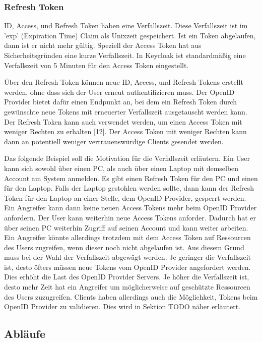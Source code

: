 \subsubsection{Refresh Token}

ID, Access, und Refresh Token haben eine Verfallszeit. Diese Verfallszeit ist im 'exp' (Expiration Time) Claim als Unixzeit gespeichert. Ist ein Token abgelaufen, dann ist er nicht mehr gültig. Speziell der Access Token hat aus Sicherheitsgründen eine kurze Verfallszeit. In Keycloak ist standardmäßig eine Verfallszeit von 5 Minuten für den Access Token eingestellt.

Über den Refresh Token können neue ID, Access, und Refresh Tokens erstellt werden, ohne dass sich der User erneut authentifizieren muss. Der OpenID Provider bietet dafür einen Endpunkt an, bei dem ein Refresh Token durch gewünschte neue Tokens mit erneuerter Verfallszeit ausgetauscht werden kann. Der Refresh Token kann auch verwendet werden, um einen Access Token mit weniger Rechten zu erhalten [12]. Der Access Token mit weniger Rechten kann dann an potentiell weniger vertrauenswürdige Clients gesendet werden.

Das folgende Beispiel soll die Motivation für die Verfallszeit erläutern. Ein User kann sich sowohl über einen PC, als auch über einen Laptop mit demselben Account am System anmelden. Es gibt einen Refresh Token für den PC und einen für den Laptop. Falls der Laptop gestohlen werden sollte, dann kann der Refresh Token für den Laptop an einer Stelle, dem OpenID Provider, gesperrt werden. Ein Angreifer kann dann keine neuen Access Tokens mehr beim OpenID Provider anfordern. Der User kann weiterhin neue Access Tokens anforder. Dadurch hat er über seinen PC weiterhin Zugriff auf seinen Account und kann weiter arbeiten. Ein Angreifer könnte allerdings trotzdem mit dem Access Token auf Ressourcen des Users zugreifen, wenn dieser noch nicht abgelaufen ist. Aus diesem Grund muss bei der Wahl der Verfallszeit abgewägt werden. Je geringer die Verfallszeit ist, desto öfters müssen neue Tokens vom OpenID Provider angefordert werden. Dies erhöht die Last des OpenID Provider Servers. Je höher die Verfallszeit ist, desto mehr Zeit hat ein Angreifer um möglicherweise auf geschützte Ressourcen des Users zuzugreifen. Clients haben allerdings auch die Möglichkeit, Tokens beim OpenID Provider zu validieren. Dies wird in Sektion TODO näher erläutert.

\subsection{Abläufe}

